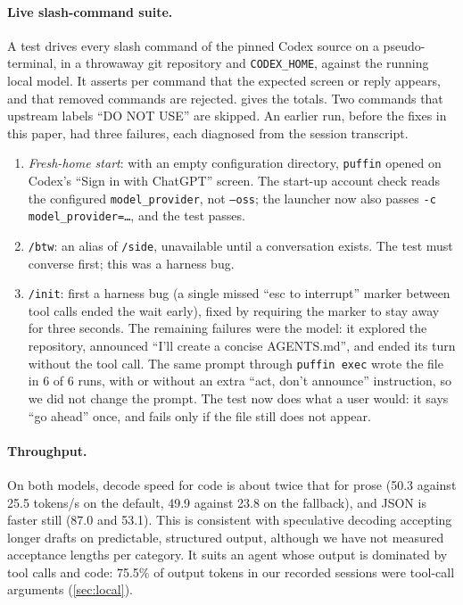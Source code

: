 \documentclass[11pt]{article}
\newcommand{\code}[1]{\texttt{#1}}
\begin{document}
\paragraph{Live slash-command suite.} A test drives every slash command of the pinned Codex source
on a pseudo-terminal, in a throwaway git repository and \code{CODEX\_HOME}, against the running
local model. It asserts per command that the expected screen or reply appears, and that removed
commands are rejected.  gives the totals. Two commands that upstream labels ``DO NOT
USE'' are skipped. An earlier run, before the fixes in this paper, had three failures, each
diagnosed from the session transcript.
\begin{enumerate}
  \item \emph{Fresh-home start}: with an empty configuration directory, \code{puffin} opened on
    Codex's ``Sign in with ChatGPT'' screen. The start-up account check reads the configured
    \code{model\_provider}, not \code{--oss}; the launcher now also passes
    \code{-c model\_provider=\ldots}, and the test passes.
  \item \code{/btw}: an alias of \code{/side}, unavailable until a conversation exists. The test
    must converse first; this was a harness bug.
  \item \code{/init}: first a harness bug (a single missed ``esc to interrupt'' marker between tool
    calls ended the wait early), fixed by requiring the marker to stay away for three seconds. The
    remaining failures were the model: it explored the repository, announced ``I'll create a
    concise AGENTS.md'', and ended its turn without the tool call. The same prompt through
    \code{puffin exec} wrote the file in 6 of 6 runs, with or without an extra
    ``act, don't announce'' instruction, so we did not change the prompt. The test now does what a
    user would: it says ``go ahead'' once, and fails only if the file still does not appear.
\end{enumerate}

\paragraph{Throughput.} On both models, decode speed for code is about twice that for prose (50.3
against 25.5 tokens/s on the default, 49.9 against 23.8 on the fallback), and JSON is faster still
(87.0 and 53.1). This is consistent with speculative decoding accepting longer drafts on
predictable, structured output, although we have not measured acceptance lengths per category. It
suits an agent whose output is dominated by tool calls and code: 75.5\% of output tokens in our
recorded sessions were tool-call arguments (\cref{sec:local}).
\end{document}

